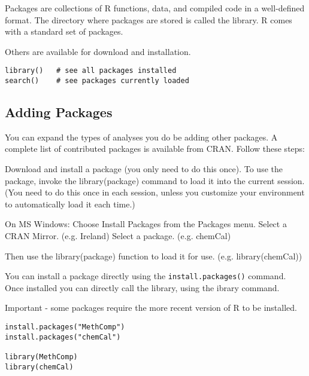 Packages are collections of R functions, data, and compiled code in a well-defined format. The directory where packages are stored is called the library. R comes with a standard set of packages. 

Others are available for download and installation.

\begin{framed}
\begin{verbatim}
library()   # see all packages installed 
search()    # see packages currently loaded
\end{verbatim}
\end{framed}

\subsection{Adding Packages}
You can expand the types of analyses you do be adding other packages. A complete list of contributed packages is available from CRAN.
Follow these steps:

Download and install a package (you only need to do this once).
To use the package, invoke the library(package) command to load it into the current session. 
(You need to do this once in each session, unless you customize your environment to automatically load it each time.)

On MS Windows:
Choose Install Packages from the Packages menu.
Select a CRAN Mirror. (e.g. Ireland)
Select a package. (e.g. chemCal)

Then use the library(package) function to load it for use. (e.g. library(chemCal))

You can install a package directly using the \texttt{install.packages()} command. Once installed you can directly call the library, using the ibrary command. 

Important - some packages require the more recent version of R to be installed.

\begin{framed}
\begin{verbatim}
install.packages("MethComp")
install.packages("chemCal")

library(MethComp)
library(chemCal)
\end{verbatim}
\end{framed}
